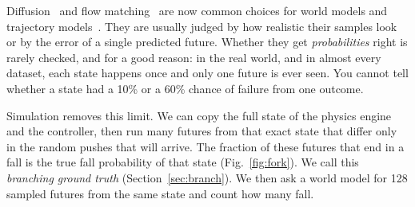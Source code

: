 \documentclass[conference]{IEEEtran}
\begin{document}
Diffusion~\cite{ho2020ddpm,song2021sde} and flow matching~\cite{lipman2023flow,liu2023rectified}
are now common choices for world models and trajectory
models~\cite{janner2022diffuser,alonso2024diamond,ding2024dwm,rigter2024polygrad,valevski2025gamengen}.
They are usually judged by how realistic their samples look or by the error of a single
predicted future. Whether they get \emph{probabilities} right is rarely checked, and for a
good reason: in the real world, and in almost every dataset, each state happens once and
only one future is ever seen. You cannot tell whether a state had a 10\% or a 60\% chance
of failure from one outcome.

Simulation removes this limit. We can copy the full state of the physics engine and the
controller, then run many futures from that exact state that differ only in the random
pushes that will arrive. The fraction of these futures that end in a fall is the true fall
probability of that state (Fig.~\ref{fig:fork}). We call this \emph{branching ground
truth} (Section~\ref{sec:branch}). We then ask a world model for 128 sampled futures from
the same state and count how many fall.
\end{document}
